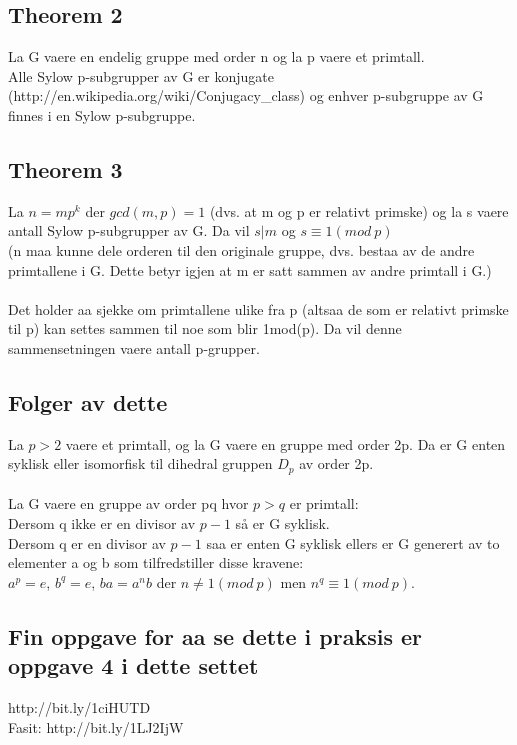 \documentclass[12pt,a4paper]{article}
\begin{document}
\subsection*{Theorem 2}
La G vaere en endelig gruppe med order n og la p vaere et primtall.\\
Alle Sylow p-subgrupper av G er konjugate (http://en.wikipedia.org/wiki/Conjugacy\_class) og enhver p-subgruppe av G finnes i en Sylow p-subgruppe. 

\subsection*{Theorem 3}
La $n = mp^k$ der $gcd(m,p) = 1$ (dvs. at m og p er relativt primske) og la s vaere antall Sylow p-subgrupper av G. Da vil $s | m $ og $s \equiv 1(mod\  p )$\\
(n maa kunne dele orderen til den originale gruppe, dvs. bestaa av de andre primtallene i G. Dette betyr igjen at m er satt sammen av andre primtall i G.)\\\\

Det holder aa sjekke om primtallene ulike fra p (altsaa de som er relativt primske til p) kan settes sammen til noe som blir 1mod(p). Da vil denne sammensetningen vaere antall p-grupper. 

\subsection*{Folger av dette}
La $p>2$ vaere et primtall, og la G vaere en gruppe med order 2p. Da er G enten syklisk eller isomorfisk til dihedral gruppen $D_p$ av order 2p.\\\\

La G vaere en gruppe av order pq hvor $p>q$ er primtall: \\
Dersom q ikke er en divisor av $p-1$ så er G syklisk. \\
Dersom q er en divisor av $p-1$ saa er enten G syklisk ellers er G generert av to elementer a og b som tilfredstiller disse kravene:\\
$a^p = e$, $b^q = e$, $ba = a^n b$ der $n \neq 1(mod\ p)$ men $n^q \equiv 1 (mod\ p)$.

\subsection*{Fin oppgave for aa se dette i praksis er oppgave 4 i dette settet}
http://bit.ly/1ciHUTD\\
Fasit:
http://bit.ly/1LJ2IjW
\end{document}
